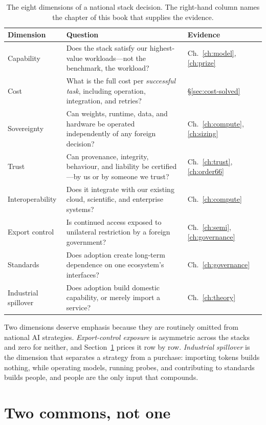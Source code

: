 \begin{table}[htbp]
  \centering
  \small
  \caption{The eight dimensions of a national stack decision. The right-hand column names the chapter of this book that supplies the evidence.}
  \label{tab:decision}
  \begin{tabular}{p{28mm}p{86mm}p{24mm}}
    \toprule
    Dimension & Question & Evidence \\
    \midrule
    Capability & Does the stack satisfy our highest-value workloads---not the benchmark, the workload? & Ch.~\ref{ch:model}, \ref{ch:prize} \\
    Cost & What is the full cost per \emph{successful task}, including operation, integration, and retries? & \S\ref{sec:cost-solved} \\
    Sovereignty & Can weights, runtime, data, and hardware be operated independently of any foreign decision? & Ch.~\ref{ch:compute}, \ref{ch:sizing} \\
    Trust & Can provenance, integrity, behaviour, and liability be certified---by us or by someone we trust? & Ch.~\ref{ch:trust}, \ref{ch:order66} \\
    Interoperability & Does it integrate with our existing cloud, scientific, and enterprise systems? & Ch.~\ref{ch:compute} \\
    Export control & Is continued access exposed to unilateral restriction by a foreign government? & Ch.~\ref{ch:semi}, \ref{ch:governance} \\
    Standards & Does adoption create long-term dependence on one ecosystem's interfaces? & Ch.~\ref{ch:governance} \\
    Industrial spillover & Does adoption build domestic capability, or merely import a service? & Ch.~\ref{ch:theory} \\
    \bottomrule
  \end{tabular}
\end{table}

Two dimensions deserve emphasis because they are routinely omitted from national AI strategies. \emph{Export-control exposure} is asymmetric across the stacks and zero for neither, and Section~\ref{sec:two-commons} prices it row by row. \emph{Industrial spillover} is the dimension that separates a strategy from a purchase: importing tokens builds nothing, while operating models, running probes, and contributing to standards builds people, and people are the only input that compounds.

\section{Two commons, not one}
\label{sec:two-commons}

